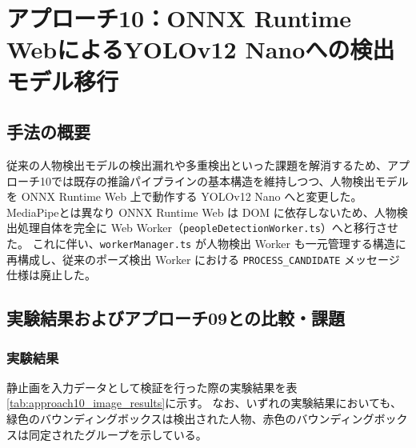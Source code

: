 \section{アプローチ10：ONNX Runtime WebによるYOLOv12 Nanoへの検出モデル移行}

\subsection{手法の概要}
従来の人物検出モデルの検出漏れや多重検出といった課題を解消するため、アプローチ10では既存の推論パイプラインの基本構造を維持しつつ、人物検出モデルを ONNX Runtime Web 上で動作する YOLOv12 Nano へと変更した。
MediaPipeとは異なり ONNX Runtime Web は DOM に依存しないため、人物検出処理自体を完全に Web Worker（\texttt{peopleDetectionWorker.ts}）へと移行させた。
これに伴い、\texttt{workerManager.ts} が人物検出 Worker も一元管理する構造に再構成し、従来のポーズ検出 Worker における \texttt{PROCESS\_CANDIDATE} メッセージ仕様は廃止した。

\subsection{実験結果およびアプローチ09との比較・課題}

\subsubsection{実験結果}
静止画を入力データとして検証を行った際の実験結果を表\ref{tab:approach10_image_results}に示す。
なお、いずれの実験結果においても、緑色のバウンディングボックスは検出された人物、赤色のバウンディングボックスは同定されたグループを示している。

